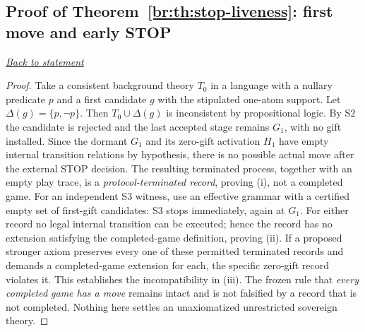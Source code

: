 \documentclass[11pt,letterpaper]{article}
\theoremstyle{definition}\newtheorem{definition}[theorem]{Definition}\newtheorem{example}[theorem]{Example}
\theoremstyle{remark}\newtheorem{remark}[theorem]{Remark}
\newcommand{\backlink}[1]{\noindent\hyperref[#1]{\textit{Back to statement}}\par\smallskip}
\begin{document}
\subsection{Proof of Theorem~\ref{br:th:stop-liveness}: first move and early STOP}\label{br:pr:stop-liveness}
\backlink{br:th:stop-liveness}
\begin{proof}
Take a consistent background theory $T_0$ in a language with a nullary
predicate $p$ and a first candidate $g$ with the stipulated one-atom support.
Let $\Delta(g)=\{p,\neg p\}$. Then $T_0\cup\Delta(g)$ is inconsistent
by propositional logic. By S2 the candidate is rejected and the last
accepted stage remains $G_1$, with no gift installed. Since the dormant
$G_1$ and its zero-gift activation $H_1$ have empty internal transition
relations by hypothesis, there is no possible actual move after the external
STOP decision. The resulting terminated process, together with an empty play
trace, is a \emph{protocol-terminated record}, proving (i), not a completed
game. For an independent S3 witness, use an effective grammar with a certified
empty set of first-gift candidates: S3 stops immediately, again at $G_1$.
For either record no legal internal transition can be executed; hence the
record has no extension satisfying the completed-game definition, proving
(ii). If a proposed stronger axiom preserves every one of these permitted
terminated records and demands a completed-game extension for each, the
specific zero-gift record violates it. This establishes the incompatibility
in (iii). The frozen rule that \emph{every completed game has a move} remains
intact and is not falsified by a record that is not completed. Nothing here
settles an unaxiomatized unrestricted sovereign theory.
\end{proof}
\end{document}
